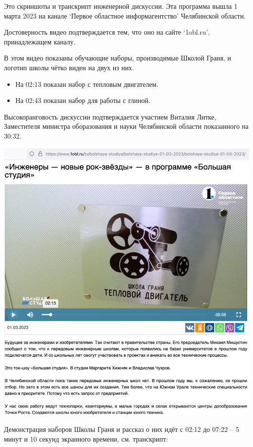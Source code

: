 
Это скриншоты и транскрипт инженерной дискуссии.
Эта программа вышла 1 марта 2023 на канале `Первое областное информагентство'
Челябинской области.

Достоверность видео подтверждается тем, что оно на сайте `1obl.ru', принадлежащем каналу.

В этом видео показаны обучающие наборы, производимые Школой Граня,
и логотип школы чётко виден на двух из них.

\begin{itemize}
    \item На 02:13 показан набор с тепловым двигателем.
    \item На 02:43 показан набор для работы с глиной.
\end{itemize}

Высокоранговость дискуссии подтверждается участием
Виталия Литке, Заместителя министра оборазования и науки Челябинской области
показанного на 30:32.

\includegraphics[width=\textwidth]{bag}






Демонстрация наборов Школы Граня и рассказ о них идёт с
02:12 до 07:22 -- 5 минут и 10 секунд экранного времени,
см. транскрипт:





\pagebreak
